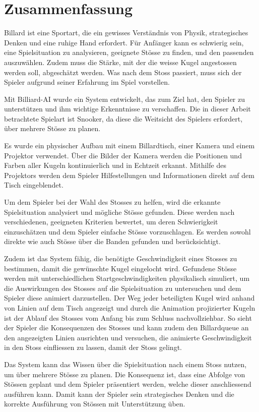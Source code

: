 \chapter{Zusammenfassung}
Billard ist eine Sportart, die ein gewisses Verständnis von Physik, strategisches Denken und eine ruhige Hand erfordert.
Für Anfänger kann es schwierig sein, eine Spielsituation zu analysieren, geeignete Stösse zu finden, und den passenden auszuwählen.
Zudem muss die Stärke, mit der die weisse Kugel angestossen werden soll, abgeschätzt werden.
Was nach dem Stoss passiert, muss sich der Spieler aufgrund seiner Erfahrung im Spiel vorstellen.

Mit Billiard-AI wurde ein System entwickelt, das zum Ziel hat, den Spieler zu unterstützen und ihm wichtige Erkenntnisse
zu verschaffen.
Die in dieser Arbeit betrachtete Spielart ist Snooker, da diese die Weitsicht des Spielers erfordert, über mehrere Stösse zu planen.

Es wurde ein physischer Aufbau mit einem Billardtisch, einer Kamera und einem Projektor verwendet.
Über die Bilder der Kamera werden die Positionen und Farben aller Kugeln kontinuierlich und in Echtzeit erkannt.
Mithilfe des Projektors werden dem Spieler Hilfestellungen und Informationen direkt auf dem Tisch eingeblendet.

Um dem Spieler bei der Wahl des Stosses zu helfen, wird die erkannte Spielsituation analysiert und mögliche Stösse gefunden.
Diese werden nach verschiedenen, geeigneten Kriterien bewertet, um deren Schwierigkeit einzuschätzen und dem Spieler
einfache Stösse vorzuschlagen.
Es werden sowohl direkte wie auch Stösse über die Banden gefunden und berücksichtigt.

Zudem ist das System fähig, die benötigte Geschwindigkeit eines Stosses zu bestimmen, damit die gewünschte Kugel eingelocht wird.
Gefundene Stösse werden mit unterschiedlichen Startgeschwindigkeiten physikalisch simuliert, um die Auswirkungen
des Stosses auf die Spielsituation zu untersuchen und dem Spieler diese animiert darzustellen.
Der Weg jeder beteiligten Kugel wird anhand von Linien auf dem Tisch angezeigt und durch die Animation projizierter Kugeln
ist der Ablauf des Stosses vom Anfang bis zum Schluss nachvollziehbar.
So sieht der Spieler die Konsequenzen des Stosses und kann zudem den Billardqueue an den angezeigten Linien ausrichten
und versuchen, die animierte Geschwindigkeit in den Stoss einfliessen zu lassen, damit der Stoss gelingt.

Das System kann das Wissen über die Spielsituation nach einem Stoss nutzen, um über mehrere Stösse zu planen.
Die Konsequenz ist, dass eine Abfolge von Stössen geplant und dem Spieler präsentiert werden, welche dieser anschliessend
ausführen kann.
Damit kann der Spieler sein strategisches Denken und die korrekte Ausführung von Stössen mit Unterstützung üben.

